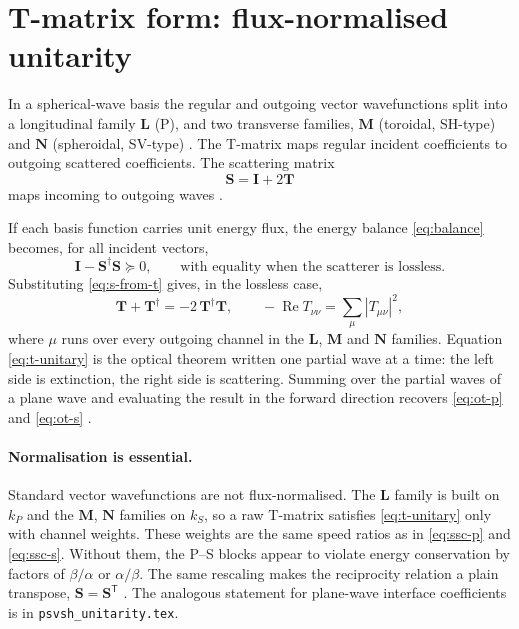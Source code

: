 \documentclass[11pt,a4paper]{article}
\newcommand{\bI}{\mathbf{I}}
\newcommand{\bT}{\mathbf{T}}
\newcommand{\bS}{\mathbf{S}}
\newcommand{\herm}{^{\dagger}}
\newcommand{\kp}{k_{P}}
\newcommand{\ks}{k_{S}}
\DeclareMathOperator{\Real}{Re}
\begin{document}
\section{T-matrix form: flux-normalised unitarity}
\label{sec:tmatrix}

In a spherical-wave basis the regular and outgoing vector wavefunctions
split into a longitudinal family $\mathbf{L}$ (P), and two transverse
families, $\mathbf{M}$ (toroidal, SH-type) and $\mathbf{N}$ (spheroidal,
SV-type) \citep{PaoMow1973,Waterman1976}. The T-matrix maps regular
incident coefficients to outgoing scattered coefficients. The scattering
matrix
\begin{equation}
  \bS = \bI + 2\bT
  \label{eq:s-from-t}
\end{equation}
maps incoming to outgoing waves \citep{VaratharajuluPao1976,Newton1982}.

If each basis function carries unit energy flux, the energy balance
\eqref{eq:balance} becomes, for all incident vectors,
\begin{equation}
  \bI - \bS\herm\bS \succeq 0,
  \qquad \text{with equality when the scatterer is lossless.}
  \label{eq:unitary}
\end{equation}
Substituting \eqref{eq:s-from-t} gives, in the lossless case,
\begin{equation}
  \bT + \bT\herm = -2\,\bT\herm\bT,
  \qquad
  -\Real T_{\nu\nu} = \sum_{\mu} |T_{\mu\nu}|^{2},
  \label{eq:t-unitary}
\end{equation}
where $\mu$ runs over every outgoing channel in the $\mathbf{L}$,
$\mathbf{M}$ and $\mathbf{N}$ families. Equation \eqref{eq:t-unitary}
is the optical theorem written one partial wave at a time: the left
side is extinction, the right side is scattering. Summing over the
partial waves of a plane wave and evaluating the result in the forward
direction recovers \eqref{eq:ot-p} and \eqref{eq:ot-s}
\citep{Waterman1976,Varatharajulu1977}.

\paragraph{Normalisation is essential.} Standard vector wavefunctions
are not flux-normalised. The $\mathbf{L}$ family is built on $\kp$ and
the $\mathbf{M}$, $\mathbf{N}$ families on $\ks$, so a raw T-matrix
satisfies \eqref{eq:t-unitary} only with channel weights. These weights
are the same speed ratios as in \eqref{eq:ssc-p} and \eqref{eq:ssc-s}.
Without them, the P--S blocks appear to violate energy conservation by
factors of $\beta/\alpha$ or $\alpha/\beta$. The same rescaling makes
the reciprocity relation a plain transpose, $\bS = \bS^{\mathsf T}$
\citep{Varatharajulu1977,Pao1978}. The analogous statement for
plane-wave interface coefficients is in \texttt{psvsh\_unitarity.tex}.
\end{document}
